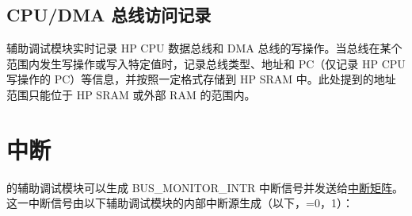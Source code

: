 \documentclass[main\_\_CN.tex]{subfiles}
\begin{document}
\subsection{CPU/DMA 总线访问记录}

辅助调试模块实时记录 HP CPU 数据总线和 DMA 总线的写操作。当总线在某个范围内发生写操作或写入特定值时，记录总线类型、地址和 PC（仅记录 HP CPU 写操作的 PC）等信息，并按照一定格式存储到 HP SRAM 中。此处提到的地址范围只能位于 HP SRAM 或外部 RAM 的范围内。


\section{中断}
\label{sec:dbgassist-interrupts}

\chipname{} 的辅助调试模块可以生成 BUS\_MONITOR\_INTR 中断信号并发送给\hyperref[mod:intmtrx]{中断矩阵}。这一中断信号由以下辅助调试模块的内部中断源生成（以下，=0，1）：
\end{document}
